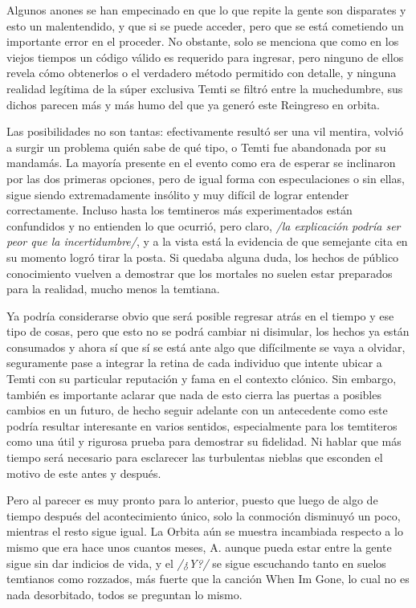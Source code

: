 \documentclass[
]{book}
\begin{document}
Algunos anones se han empecinado en que lo que repite la gente son disparates y esto un malentendido, y que si se puede acceder, pero que se está cometiendo un importante error en el proceder. No obstante, solo se menciona que como en los viejos tiempos un código válido es requerido para ingresar, pero ninguno de ellos revela cómo obtenerlos o el verdadero método permitido con detalle, y ninguna realidad legítima de la súper exclusiva Temti se filtró entre la muchedumbre, sus dichos parecen más y más humo del que ya generó este Reingreso en orbita.

Las posibilidades no son tantas: efectivamente resultó ser una vil mentira, volvió a surgir un problema quién sabe de qué tipo, o Temti fue abandonada por su mandamás. La mayoría presente en el evento como era de esperar se inclinaron por las dos primeras opciones, pero de igual forma con especulaciones o sin ellas, sigue siendo extremadamente insólito y muy difícil de lograr entender correctamente. Incluso hasta los temtineros más experimentados están confundidos y no entienden lo que ocurrió, pero claro, \emph{/la explicación podría ser peor que la incertidumbre/}, y a la vista está la evidencia de que semejante cita en su momento logró tirar la posta. Si quedaba alguna duda, los hechos de público conocimiento vuelven a demostrar que los mortales no suelen estar preparados para la realidad, mucho menos la temtiana.

Ya podría considerarse obvio que será posible regresar atrás en el tiempo y ese tipo de cosas, pero que esto no se podrá cambiar ni disimular, los hechos ya están consumados y ahora sí que sí se está ante algo que difícilmente se vaya a olvidar, seguramente pase a integrar la retina de cada individuo que intente ubicar a Temti con su particular reputación y fama en el contexto clónico. Sin embargo, también es importante aclarar que nada de esto cierra las puertas a posibles cambios en un futuro, de hecho seguir adelante con un antecedente como este podría resultar interesante en varios sentidos, especialmente para los temtiteros como una útil y rigurosa prueba para demostrar su fidelidad. Ni hablar que más tiempo será necesario para esclarecer las turbulentas nieblas que esconden el motivo de este antes y después.

Pero al parecer es muy pronto para lo anterior, puesto que luego de algo de tiempo después del acontecimiento único, solo la conmoción disminuyó un poco, mientras el resto sigue igual. La Orbita aún se muestra incambiada respecto a lo mismo que era hace unos cuantos meses, A. aunque pueda estar entre la gente sigue sin dar indicios de vida, y el \emph{/¿Y?/} se sigue escuchando tanto en suelos temtianos como rozzados, más fuerte que la canción When Im Gone, lo cual no es nada desorbitado, todos se preguntan lo mismo.
\end{document}
